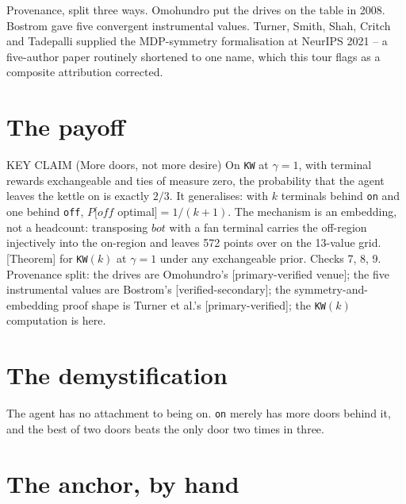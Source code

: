 Provenance, split three ways. Omohundro put the drives on the table in 2008. Bostrom gave five convergent instrumental values. Turner, Smith, Shah, Critch and Tadepalli supplied the MDP-symmetry formalisation at NeurIPS 2021 -- a five-author paper routinely shortened to one name, which this tour flags as a composite attribution corrected.

\section*{The payoff}

\begin{whybox}{KEY CLAIM (More doors, not more desire)}
On \texttt{KW} at $\gamma = 1$, with terminal rewards exchangeable and ties of measure zero, the probability that the agent leaves the kettle on is exactly $2/3$. It generalises: with $k$ terminals behind \texttt{on} and one behind \texttt{off}, $P[off$ optimal$] = 1/(k+1)$. The mechanism is an embedding, not a headcount: transposing $bot$ with a fan terminal carries the off-region injectively into the on-region and leaves 572 points over on the 13-value grid. [Theorem] for \texttt{KW}$(k)$ at $\gamma = 1$ under any exchangeable prior. Checks 7, 8, 9.
Provenance split: the drives are Omohundro's [primary-verified venue]; the five instrumental values are Bostrom's [verified-secondary]; the symmetry-and-embedding proof shape is Turner et al.'s [primary-verified]; the \texttt{KW}$(k)$ computation is here.
\end{whybox}

\section*{The demystification}

\begin{whyboxnt}
The agent has no attachment to being on. \texttt{on} merely has more doors behind it, and the best of two doors beats the only door two times in three.
\end{whyboxnt}

\section*{The anchor, by hand}

